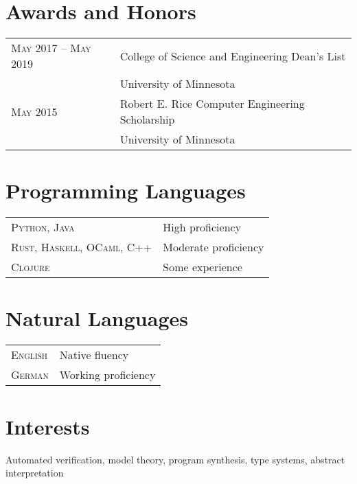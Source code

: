\documentclass{article} %
\begin{document}
\section{Awards and Honors}

\begin{tabular}{R{4cm}p{11cm}}
    \textsc{May 2017 -- May 2019} & College of Science and Engineering Dean's List\\
    & \footnotesize University of Minnesota\\
    \textsc{May 2015} & Robert E. Rice Computer Engineering Scholarship\\
    & \footnotesize University of Minnesota\\
\end{tabular}


\section{Programming Languages}

\begin{tabular}{R{4cm}p{11cm}}
    \textsc{Python, Java} & High proficiency \\
    \textsc{Rust, Haskell, OCaml, C++} & Moderate proficiency \\
    \textsc{Clojure} & Some experience \\
\end{tabular}



\section{Natural Languages}

\begin{tabular}{R{4cm}l}
    \textsc{English} & Native fluency \\
    \textsc{German} & Working proficiency \\
\end{tabular}


\section{Interests}

Automated verification, model theory, program synthesis, type systems, abstract interpretation
\end{document}
